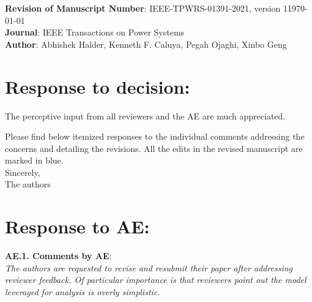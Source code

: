 \documentclass[12pt,onecolumn]{IEEEtran}
\newcommand{\blue}{\color{blue}}
\newcommand{\bp}{{\bm{p}}}
\def\spacingset#1{\def\baselinestretch{#1}\small\normalsize}
\begin{document}
\noindent
{\large {\bf Revision of
Manuscript Number}: IEEE-TPWRS-01391-2021, version 1\hfill \today\\[.1in]
{\bf Journal}: IEEE Transactions on Power Systems \\[.1in]
{\bf Author}: Abhishek Halder, Kenneth F. Caluya, Pegah Ojaghi, Xinbo Geng}\\



\section*{\large \bf Response to decision:}

{\noindent\blue
The perceptive input from all reviewers and the AE are much appreciated. 

Please find below itemized responses to the individual comments addressing the concerns and detailing the revisions. All the edits in the revised manuscript are marked in blue.\\

\noindent
Sincerely,\\
The authors
}



\spacingset{1}

\section*{\large \bf Response to AE:}

\noindent
{\bf AE.1. Comments by AE}:\\
{\em The authors are requested to revise and resubmit their paper after addressing reviewer feedback. Of particular importance is that reviewers point out the model leveraged for analysis is overly simplistic.}
\end{document}

